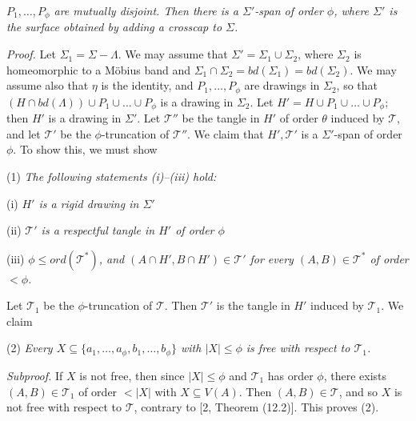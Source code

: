 \noindent \textit{$P_1, \dots, P_\phi$ are mutually disjoint. Then there is a $\Sigma'$-span of order $\phi$, where $\Sigma'$ is the surface obtained by adding a crosscap to $\Sigma$.}

\textit{Proof.} Let $\Sigma_1 = \Sigma - \Lambda$. We may assume that $\Sigma' = \Sigma_1 \cup \Sigma_2$, where $\Sigma_2$ is homeomorphic to a M\"obius band and $\Sigma_1 \cap \Sigma_2 = bd(\Sigma_1) = bd(\Sigma_2)$. We may assume also that $\eta$ is the identity, and $P_1, \dots, P_\phi$ are drawings in $\Sigma_2$, so that $(H \cap bd(\Lambda)) \cup P_1 \cup \dots \cup P_\phi$ is a drawing in $\Sigma_2$. Let $H' = H \cup P_1 \cup \dots \cup P_\phi$; then $H'$ is a drawing in $\Sigma'$. Let $\mathscr{T}''$ be the tangle in $H'$ of order $\theta$ induced by $\mathscr{T}$, and let $\mathscr{T}'$ be the $\phi$-truncation of $\mathscr{T}''$. We claim that $H', \mathscr{T}'$ is a $\Sigma'$-span of order $\phi$. To show this, we must show

\hspace*{12pt}(1) \textit{The following statements (i)--(iii) hold:}

\hspace*{12pt}(i) \textit{$H'$ is a rigid drawing in $\Sigma'$}

\hspace*{12pt}(ii) \textit{$\mathscr{T}'$ is a respectful tangle in $H'$ of order $\phi$}

\hspace*{12pt}(iii) \textit{$\phi \le ord(\mathscr{T}^*)$, and $(A \cap H', B \cap H') \in \mathscr{T}'$ for every $(A, B) \in \mathscr{T}^*$ of order $< \phi$.}

Let $\mathscr{T}_1$ be the $\phi$-truncation of $\mathscr{T}$. Then $\mathscr{T}'$ is the tangle in $H'$ induced by $\mathscr{T}_1$. We claim

\hspace*{12pt}(2) \textit{Every $X \subseteq \{a_1, \dots, a_\phi, b_1, \dots, b_\phi\}$ with $|X| \le \phi$ is free with respect to $\mathscr{T}_1$.}

\textit{Subproof.} If $X$ is not free, then since $|X| \le \phi$ and $\mathscr{T}_1$ has order $\phi$, there exists $(A, B) \in \mathscr{T}_1$ of order $< |X|$ with $X \subseteq V(A)$. Then $(A, B) \in \mathscr{T}$, and so $X$ is not free with respect to $\mathscr{T}$, contrary to [2, Theorem (12.2)]. This proves (2).

